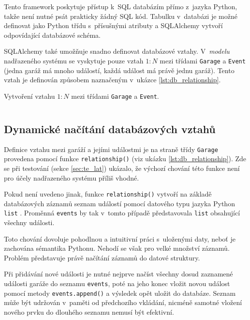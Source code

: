 Tento framework poskytuje přístup k~SQL databázím přímo z~jazyka Python, takže není nutné psát prakticky žádný SQL kód. Tabulku v~databázi je možné definovat jako Python třídu s~přísušnými atributy a SQLAlchemy vytvoří odpovídající databázové schéma. 

SQLAlchemy také umožňuje snadno definovat databázové vztahy. V~\textit{modelu} nadřazeného systému se vyskytuje pouze vztah $1:N$ mezi třídami \texttt{Garage} a \texttt{Event} (jedna garáž má mnoho událostí, každá událost má právě jednu garáž). Tento vztah je definován způsobem naznačeným v~ukázce \ref{lst:db_relationship}.

\begin{listing}[htbp]
\caption{\label{lst:db_relationship} Vytvoření vztahu $1:N$ mezi třídami \texttt{Garage} a \texttt{Event}.}
\inputminted[bgcolor=codebg]{python}{source-samples/db_relationship.py}
\end{listing}

\subsection{Dynamické načítání databázových vztahů}
\label{sec:im_lazy}

Definice vztahu mezi garáží a jejími událostmi je na straně třídy \texttt{Garage} provedena pomocí funkce \texttt{relationship()} (viz ukázku \ref{lst:db_relationship}). Zde se při testování (sekce \ref{sec:te_lat}) ukázalo, že výchozí chování této funkce není pro účely nadřazeného systému příliš vhodné.

Pokud není uvedeno jinak, funkce \texttt{relationship()} vytvoří na základě databázových záznamů seznam událostí pomocí datového typu jazyka Python \texttt{list} \cite{sqlalchemy_col}. Proměnná \texttt{events} by tak v~tomto případě představovala \texttt{list} obsahující všechny události.

Toto chování dovoluje pohodlnou a intuitivní práci s~uloženými daty, neboť je zachována sémantika Pythonu. Nehodí se však pro velké množství záznamů. Problém představuje právě načítání záznamů do datové struktury.

Při přidávání nové události je nutné nejprve načíst všechny dosud zaznamené události garáže do seznamu \texttt{events}, poté na jeho konec vložit novou událost pomocí metody \texttt{events.append()} a výsledek opět uložit do databáze. Seznam může být udržován v~paměti od předchozího vkládání, nicméně samotné vložení nového prvku do dlouhého seznamu nemusí být efektivní.

